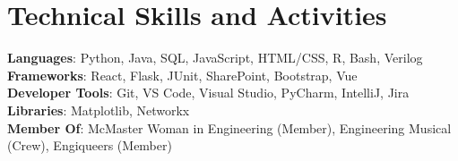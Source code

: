 \documentclass[letterpaper,11pt]{article}
\begin{document}
%
\section{Technical Skills and Activities}
 \begin{itemize}[leftmargin=0.15in, label={}]
    \small{\item{
     \textbf{Languages}{: Python, Java, SQL, JavaScript, HTML/CSS, R, Bash, Verilog} \\
     \textbf{Frameworks}{: React, Flask, JUnit, SharePoint, Bootstrap, Vue} \\
     \textbf{Developer Tools}{: Git, VS Code, Visual Studio, PyCharm, IntelliJ, Jira} \\
     \textbf{Libraries}{: Matplotlib, Networkx} \\
     \textbf{Member Of}{: McMaster Woman in Engineering (Member), Engineering Musical (Crew), Engiqueers (Member)}
    }}
 \end{itemize}


\end{document}
